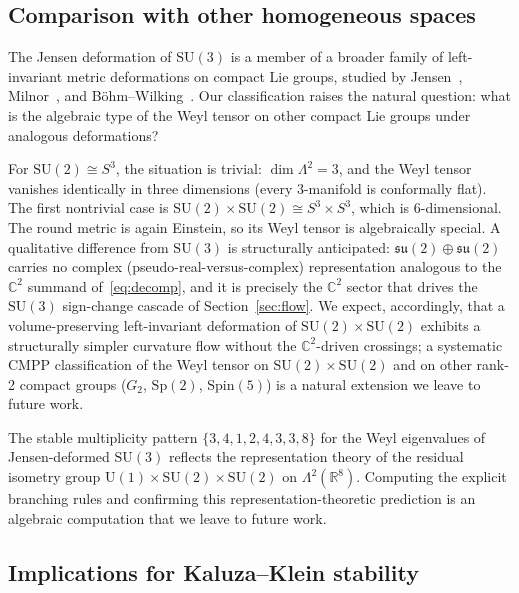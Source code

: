 \documentclass[12pt]{article}
\theoremstyle{definition}
\theoremstyle{remark}
\begin{document}
\subsection{Comparison with other homogeneous spaces}

The Jensen deformation of $\mathrm{SU}(3)$ is a member of a broader family of left-invariant metric deformations on compact Lie groups, studied by Jensen~\cite{Jensen1973}, Milnor~\cite{Milnor1976}, and B\"ohm--Wilking~\cite{BohmWilking2008}.  Our classification raises the natural question: what is the algebraic type of the Weyl tensor on other compact Lie groups under analogous deformations?

For $\mathrm{SU}(2)\cong S^3$, the situation is trivial: $\dim\Lambda^2=3$, and the Weyl tensor vanishes identically in three dimensions (every 3-manifold is conformally flat).  The first nontrivial case is $\mathrm{SU}(2)\times\mathrm{SU}(2)\cong S^3\times S^3$, which is 6-dimensional.  The round metric is again Einstein, so its Weyl tensor is algebraically special.  A qualitative difference from $\mathrm{SU}(3)$ is structurally anticipated: $\mathfrak{su}(2)\oplus\mathfrak{su}(2)$ carries no complex (pseudo-real-versus-complex) representation analogous to the $\mathbb{C}^2$ summand of~\eqref{eq:decomp}, and it is precisely the $\mathbb{C}^2$ sector that drives the $\mathrm{SU}(3)$ sign-change cascade of Section~\ref{sec:flow}.  We expect, accordingly, that a volume-preserving left-invariant deformation of $\mathrm{SU}(2)\times\mathrm{SU}(2)$ exhibits a structurally simpler curvature flow without the $\mathbb{C}^2$-driven crossings; a systematic CMPP classification of the Weyl tensor on $\mathrm{SU}(2)\times\mathrm{SU}(2)$ and on other rank-2 compact groups ($G_2$, $\mathrm{Sp}(2)$, $\mathrm{Spin}(5)$) is a natural extension we leave to future work.

The stable multiplicity pattern $\{3,4,1,2,4,3,3,8\}$ for the Weyl eigenvalues of Jensen-deformed $\mathrm{SU}(3)$ reflects the representation theory of the residual isometry group $\mathrm{U}(1)\times\mathrm{SU}(2)\times\mathrm{SU}(2)$ on $\Lambda^2(\mathbb{R}^8)$.  Computing the explicit branching rules and confirming this representation-theoretic prediction is an algebraic computation that we leave to future work.

\subsection{Implications for Kaluza--Klein stability}
\end{document}
